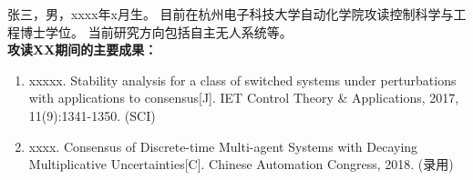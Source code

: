 张三，男，xxxx年x月生。
目前在杭州电子科技大学自动化学院攻读控制科学与工程博士学位。
当前研究方向包括自主无人系统等。\\

\noindent
\textbf{攻读XX期间的主要成果：}

\begin{enumerate}
  \item  xxxxx. 
  \newblock Stability analysis for a class of switched systems under
    perturbations with applications to consensus[J].
  \newblock IET Control Theory \& Applications, 
    2017, 11(9):1341-1350. (SCI)
  \item xxxx.
    \newblock Consensus of Discrete-time Multi-agent Systems with Decaying Multiplicative Uncertainties[C].
    \newblock Chinese Automation Congress, 2018. (录用)
\end{enumerate}